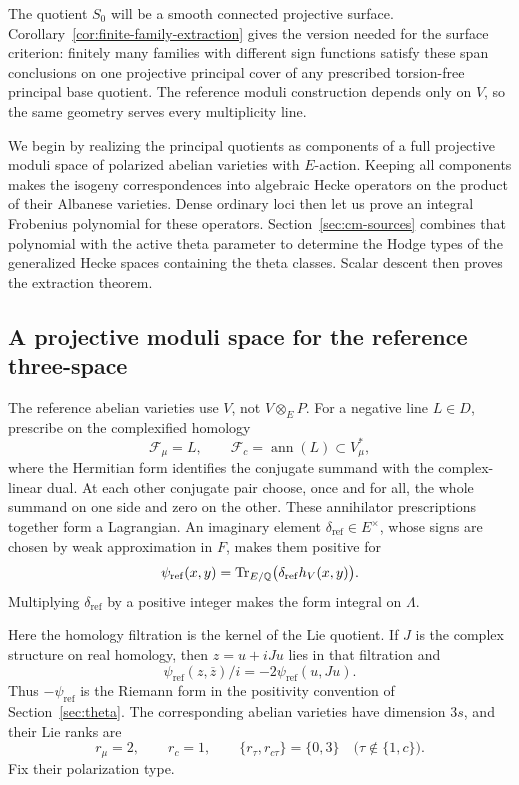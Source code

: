The quotient \(S_0\) will be a smooth connected projective surface.
Corollary~\ref{cor:finite-family-extraction} gives the version needed
for the surface criterion: finitely many families with different sign
functions satisfy these span conclusions on one projective principal
cover of any prescribed torsion-free principal base quotient.  The reference
moduli construction depends only on \(V\), so the same geometry
serves every multiplicity line.

We begin by realizing the principal quotients as components of a full
projective moduli space of polarized abelian varieties with \(E\)-action.
Keeping all components makes the isogeny correspondences into algebraic
Hecke operators on the product of their Albanese varieties.  Dense
ordinary loci then let us prove an integral Frobenius polynomial for
these operators.  Section~\ref{sec:cm-sources} combines that polynomial
with the active theta parameter to determine the Hodge types of the
generalized Hecke spaces containing the theta classes.  Scalar descent
then proves the extraction theorem.

\subsection{A projective moduli space for the reference three-space}\label{subsec:reference-moduli}

The reference abelian varieties use \(V\), not \(V\otimes_E P\).
For a negative line \(L\in D\), prescribe on the complexified homology
\[
\mathcal F_\mu=L,\qquad
\mathcal F_c=\operatorname{ann}(L)\subset V_\mu^*,
\]
where the Hermitian form identifies the conjugate summand with the
complex-linear dual.  At each other conjugate pair choose, once and
for all, the whole summand on one side and zero on the other.  These
annihilator prescriptions together form a Lagrangian.  An imaginary element
\(\delta_{\mathrm{ref}}\in E^\times\), whose signs are chosen by weak
approximation in \(F\), makes them positive for
\[
\psi_{\mathrm{ref}}(x,y)
 =\operatorname{Tr}_{E/\mathbb{Q}}\bigl(\delta_{\mathrm{ref}}h_V(x,y)\bigr).
\]
Multiplying \(\delta_{\mathrm{ref}}\) by a positive integer makes the
form integral on \(\Lambda\).

Here the homology filtration is the kernel of the Lie quotient.  If
\(J\) is the complex structure on real homology, then
\(z=u+iJu\) lies in that filtration and
\[
\psi_{\mathrm{ref}}(z,\overline z)/i
   =-2\psi_{\mathrm{ref}}(u,Ju).
\]
Thus \(-\psi_{\mathrm{ref}}\) is the Riemann form in the positivity
convention of Section~\ref{sec:theta}.  The corresponding abelian
varieties have dimension \(3s\), and their Lie ranks are
\begin{equation}\label{eq:reference-lie-ranks}
r_\mu=2,\qquad r_c=1,\qquad
\{r_\tau,r_{c\tau}\}=\{0,3\}
\quad\bigl(\tau\notin\{1,c\}\bigr).
\end{equation}
Fix their polarization type.


